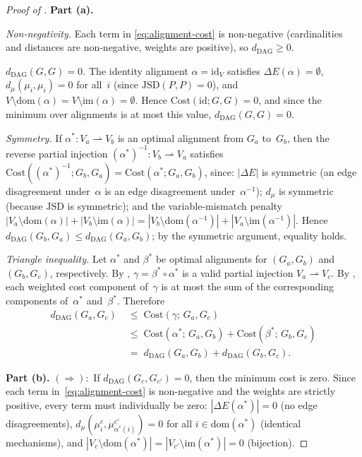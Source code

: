 \documentclass[11pt,a4paper]{article}
\theoremstyle{definition}
\newcommand{\Dom}{\mathrm{dom}}               %
\newcommand{\Img}{\mathrm{im}}                %
\newcommand{\JSD}{\mathrm{JSD}}               %
\newcommand{\Cost}{\mathrm{Cost}}             %
\newcommand{\dDAG}{d_{\mathrm{DAG}}}          %
\newcommand{\dmu}{d_{\mu}}                    %
\begin{document}
\begin{proof}[Proof of ]
\textbf{Part (a).}

\emph{Non-negativity.}
Each term in \eqref{eq:alignment-cost} is non-negative (cardinalities and
distances are non-negative, weights are positive), so $\dDAG \ge 0$.

\emph{$\dDAG(G, G) = 0$.}
The identity alignment $\alpha = \mathrm{id}_{V}$ satisfies
$\Delta E(\alpha) = \emptyset$,
$\dmu(\mu_i, \mu_i) = 0$ for all~$i$ (since $\JSD(P, P) = 0$), and
$V \setminus \Dom(\alpha) = V \setminus \Img(\alpha) = \emptyset$.
Hence $\Cost(\mathrm{id}; G, G) = 0$, and since the minimum over
alignments is at most this value, $\dDAG(G, G) = 0$.

\emph{Symmetry.}
If $\alpha^* \colon V_a \rightharpoonup V_b$ is an optimal alignment from
$G_a$ to~$G_b$, then the reverse partial injection
$(\alpha^*)^{-1} \colon V_b \rightharpoonup V_a$ satisfies
$\Cost((\alpha^*)^{-1}; G_b, G_a) = \Cost(\alpha^*; G_a, G_b)$, since:
$|\Delta E|$ is symmetric (an edge disagreement under~$\alpha$ is an edge
disagreement under~$\alpha^{-1}$); $\dmu$ is symmetric (because $\JSD$ is
symmetric); and the variable-mismatch penalty
$|V_a \setminus \Dom(\alpha)| + |V_b \setminus \Img(\alpha)|
= |V_b \setminus \Dom(\alpha^{-1})| + |V_a \setminus \Img(\alpha^{-1})|$.
Hence $\dDAG(G_b, G_a) \le \dDAG(G_a, G_b)$; by the symmetric argument,
equality holds.

\emph{Triangle inequality.}
Let $\alpha^*$ and $\beta^*$ be optimal alignments for
$(G_a, G_b)$ and $(G_b, G_c)$, respectively.  By
, $\gamma = \beta^* \circ \alpha^*$ is a valid
partial injection $V_a \rightharpoonup V_c$.  By
, each weighted cost component of~$\gamma$
is at most the sum of the corresponding components of~$\alpha^*$
and~$\beta^*$.  Therefore
\begin{align*}
  \dDAG(G_a, G_c)
  &\;\le\;
  \Cost(\gamma;\, G_a, G_c) \\
  &\;\le\;
  \Cost(\alpha^*;\, G_a, G_b) + \Cost(\beta^*;\, G_b, G_c) \\
  &\;=\;
  \dDAG(G_a, G_b) + \dDAG(G_b, G_c).
\end{align*}

\medskip
\textbf{Part (b).}
$(\Rightarrow)$:\ If $\dDAG(G_c, G_{c'}) = 0$, then the minimum cost is
zero.  Since each term in~\eqref{eq:alignment-cost} is non-negative and
the weights are strictly positive, every term must individually be zero:
$|\Delta E(\alpha^*)| = 0$ (no edge disagreements),
$\dmu(\mu_i^c, \mu_{\alpha^*(i)}^{c'}) = 0$ for all $i \in \Dom(\alpha^*)$
(identical mechanisms), and
$|V_c \setminus \Dom(\alpha^*)| = |V_{c'} \setminus \Img(\alpha^*)| = 0$
(bijection).


\end{proof}
\end{document}
